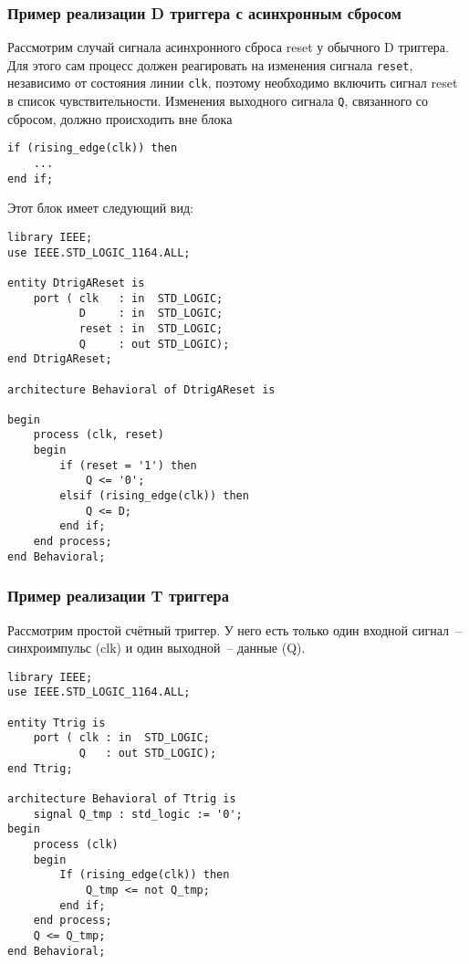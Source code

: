 \subsubsection{Пример реализации D триггера с асинхронным сбросом}

Рассмотрим случай сигнала асинхронного сброса reset у обычного D триггера. Для этого сам процесс должен реагировать на изменения сигнала \lstinline?reset?, независимо от состояния линии \lstinline?clk?, поэтому необходимо включить сигнал reset в список чувствительности. Изменения выходного сигнала \lstinline?Q?, связанного со сбросом, должно происходить вне блока 

\begin{Code}
\begin{lstlisting}
if (rising_edge(clk)) then
    ...
end if;
\end{lstlisting}
\end{Code}

Этот блок имеет следующий вид:

\begin{Code}
\begin{lstlisting}
library IEEE;
use IEEE.STD_LOGIC_1164.ALL;

entity DtrigAReset is
    port ( clk   : in  STD_LOGIC;
           D     : in  STD_LOGIC;
           reset : in  STD_LOGIC;
           Q     : out STD_LOGIC);
end DtrigAReset;

architecture Behavioral of DtrigAReset is

begin
    process (clk, reset)
    begin
        if (reset = '1') then
            Q <= '0';
        elsif (rising_edge(clk)) then
            Q <= D;
        end if;
    end process;
end Behavioral;
\end{lstlisting}
\end{Code}

\subsubsection{Пример реализации T триггера}

Рассмотрим простой счётный триггер. У него есть только один входной сигнал~-- синхроимпульс (clk) и один выходной~-- данные (Q).

\begin{Code}
\begin{lstlisting}
library IEEE;
use IEEE.STD_LOGIC_1164.ALL;

entity Ttrig is
    port ( clk : in  STD_LOGIC;
           Q   : out STD_LOGIC);
end Ttrig;

architecture Behavioral of Ttrig is
    signal Q_tmp : std_logic := '0';
begin
    process (clk)
    begin
        If (rising_edge(clk)) then
            Q_tmp <= not Q_tmp;
        end if;
    end process;
    Q <= Q_tmp;
end Behavioral;
\end{lstlisting}
\end{Code}

